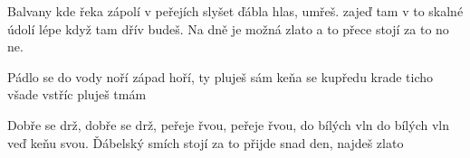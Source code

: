 
\beginverse{}
Balvany kde řeka zápolí
v peřejích slyšet ďábla hlas, umřeš.
zajeď tam v to skalné údolí
lépe když tam dřív budeš.
Na dně je možná zlato
a to přece stojí za to no ne.
\endverse{}

\beginverse{}
Pádlo se do vody noří
západ hoří, ty pluješ sám
keňa se kupředu krade
ticho všade vstříc pluješ tmám
\endverse{}

\beginchorus{}
Dobře se drž, dobře se drž,
peřeje řvou, peřeje řvou,
do bílých vln do bílých vln
veď keňu svou.
Ďábelský smích stojí za to
přijde snad den, najdeš zlato
\endchorus{}

\endsong{}
